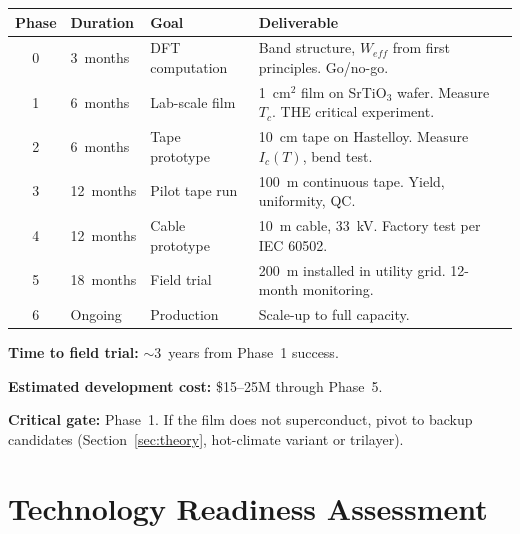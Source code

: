 \documentclass[11pt, a4paper]{article}
\begin{document}
\begin{center}
\begin{tabular}{@{}clp{3.5cm}p{4.5cm}@{}}
\toprule
\textbf{Phase} & \textbf{Duration} & \textbf{Goal} &
  \textbf{Deliverable} \\
\midrule
0 & 3~months & DFT computation & Band structure, $W_{eff}$ from first
    principles. Go/no-go. \\
1 & 6~months & Lab-scale film & 1~cm$^2$ film on SrTiO$_3$ wafer.
    Measure $T_c$. THE critical experiment. \\
2 & 6~months & Tape prototype & 10~cm tape on Hastelloy. Measure
    $I_c(T)$, bend test. \\
3 & 12~months & Pilot tape run & 100~m continuous tape. Yield,
    uniformity, QC. \\
4 & 12~months & Cable prototype & 10~m cable, 33~kV. Factory test
    per IEC 60502. \\
5 & 18~months & Field trial & 200~m installed in utility grid.
    12-month monitoring. \\
6 & Ongoing & Production & Scale-up to full capacity. \\
\bottomrule
\end{tabular}
\end{center}

\textbf{Time to field trial:} $\sim 3$~years from Phase~1 success.

\textbf{Estimated development cost:} \$15--25M through Phase~5.

\textbf{Critical gate:} Phase~1. If the film does not superconduct,
pivot to backup candidates (Section~\ref{sec:theory}, hot-climate
variant or trilayer).

\section{Technology Readiness Assessment}
\label{sec:readiness}
\end{document}
